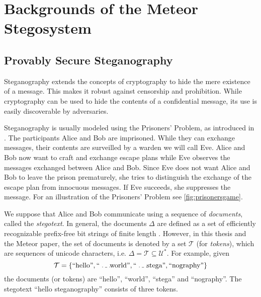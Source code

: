 \chapter{Backgrounds of the Meteor Stegosystem}
\label{chap:previous-work}

\section{Provably Secure Steganography}
\label{sec:prov-sec-steg}

Steganography extends the concepts of cryptography to hide the mere existence of a message.
This makes it robust against censorship and prohibition.
While cryptography can be used to hide the contents of a confidential message, its use is easily discoverable by adversaries.


Steganography is usually modeled using the Prisoners' Problem, as introduced in \cite{Simmons1983}.
The participants Alice and Bob are imprisoned.
While they can exchange messages, their contents are surveilled by a warden we will call Eve.
Alice and Bob now want to craft and exchange escape plans while Eve observes the messages exchanged between Alice and Bob.
Since Eve does not want Alice and Bob to leave the prison prematurely, she tries to distinguish the exchange of the escape plan from innocuous messages.
If Eve succeeds, she suppresses the message.
For an illustration of the Prisoners' Problem see \autoref{fig:prisonersgame}.

We suppose that Alice and Bob communicate using a sequence of \emph{documents}, called the \emph{stegotext}.
In general, the documents $\Delta$ are defined as a set of efficiently recognizable prefix-free bit strings of finite length \cite{Hopper2008}.
However, in this thesis and the Meteor paper, the set of documents is denoted by a set $\mathcal{T}$ (for \emph{tokens}), which are sequences of unicode characters, i.e. $\Delta = \mathcal{T} \subseteq \mathcal{U}^*$. For example, given
$$\mathcal{T} = \{ \textrm{``hello''}, \textrm{``\Vtextvisiblespace world''}, \textrm{``\Vtextvisiblespace stega''}, \textrm{``nography''} \}$$ the documents (or tokens) are ``hello'', ``\Vtextvisiblespace world'', ``\Vtextvisiblespace stega'' and ``nography''.  
The stegotext ``hello steganography'' consists of three tokens.

